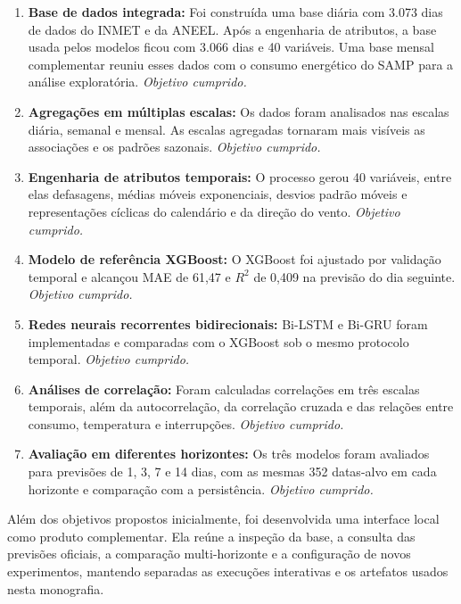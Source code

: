 \begin{enumerate}
    \item \textbf{Base de dados integrada:} Foi construída uma base diária com 3.073 dias de dados do INMET e da ANEEL. Após a engenharia de atributos, a base usada pelos modelos ficou com 3.066 dias e 40 variáveis. Uma base mensal complementar reuniu esses dados com o consumo energético do SAMP para a análise exploratória. \textit{Objetivo cumprido.}

    \item \textbf{Agregações em múltiplas escalas:} Os dados foram analisados nas escalas diária, semanal e mensal. As escalas agregadas tornaram mais visíveis as associações e os padrões sazonais. \textit{Objetivo cumprido.}

    \item \textbf{Engenharia de atributos temporais:} O processo gerou 40 variáveis, entre elas defasagens, médias móveis exponenciais, desvios padrão móveis e representações cíclicas do calendário e da direção do vento. \textit{Objetivo cumprido.}

    \item \textbf{Modelo de referência XGBoost:} O XGBoost foi ajustado por validação temporal e alcançou MAE de 61,47 e $R^2$ de 0,409 na previsão do dia seguinte. \textit{Objetivo cumprido.}

    \item \textbf{Redes neurais recorrentes bidirecionais:} Bi-LSTM e Bi-GRU foram implementadas e comparadas com o XGBoost sob o mesmo protocolo temporal. \textit{Objetivo cumprido.}

    \item \textbf{Análises de correlação:} Foram calculadas correlações em três escalas temporais, além da autocorrelação, da correlação cruzada e das relações entre consumo, temperatura e interrupções. \textit{Objetivo cumprido.}

    \item \textbf{Avaliação em diferentes horizontes:} Os três modelos foram avaliados para previsões de 1, 3, 7 e 14 dias, com as mesmas 352 datas-alvo em cada horizonte e comparação com a persistência. \textit{Objetivo cumprido.}
\end{enumerate}

Além dos objetivos propostos inicialmente, foi desenvolvida uma interface local como produto complementar. Ela reúne a inspeção da base, a consulta das previsões oficiais, a comparação multi-horizonte e a configuração de novos experimentos, mantendo separadas as execuções interativas e os artefatos usados nesta monografia.

